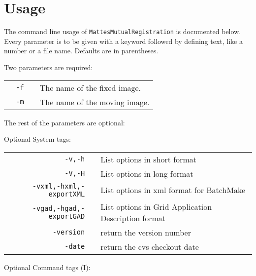 \documentclass [10pt,twocolumn,twoside,final,letterpaper]{report}
\newcommand{\bcode}{\texttt}
\newcommand{\miregprog}{\bcode{MattesMutualRegistration}}
\begin{document}
\chapter{Usage} \label{sec:usage}
The command line usage of \miregprog{} is documented below.
Every parameter is to be given with a keyword followed by defining text,
like a number or a file name.  Defaults are in parentheses.
\vspace{0.25in}\par
Two parameters are required:
\vspace{0.25in}\par
\begin{tabular}{rp{0.25in}l}
\texttt{~~-f} && \parbox[t]{3.75in}{The name of the fixed image.\vspace{0.05in}}\\
\texttt{~~-m} && \parbox[t]{3.75in}{The name of the moving image.\vspace{0.05in}}\\
\end{tabular}
\vspace{0.25in}\par
The rest of the parameters are optional:
\vspace{0.25in}\par
Optional System tags:
\vspace{0.25in}\par
\begin{tabular}{rp{0.25in}l}
\texttt{-v,-h} && \parbox[t]{3.75in}{List options in short format}\\
\texttt{-V,-H} && \parbox[t]{3.75in}{List options in long format}\\
\texttt{-vxml,-hxml,-exportXML} && \parbox[t]{3.75in}{List options in xml format for BatchMake}\\
\texttt{-vgad,-hgad,-exportGAD} && \parbox[t]{3.75in}{List options in Grid Application Description format}\\
\texttt{-version} && \parbox[t]{3.75in}{return the version number}\\
\texttt{-date} && \parbox[t]{3.75in}{return the cvs checkout date}\\
 \end{tabular}
\par
\newpage
Optional Command tags (I): 
\vspace{0.25in}\par
\end{document}
